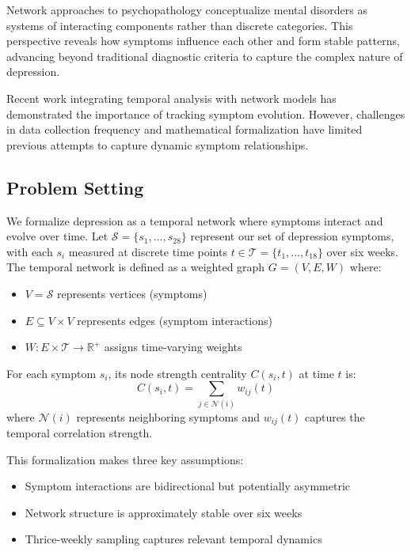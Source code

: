 \documentclass{article} %
\begin{document}
Network approaches to psychopathology \citep{Fried2016MentalDA} conceptualize mental disorders as systems of interacting components rather than discrete categories. This perspective reveals how symptoms influence each other and form stable patterns, advancing beyond traditional diagnostic criteria to capture the complex nature of depression.

Recent work integrating temporal analysis with network models \citep{Robinaugh2019TheNA} has demonstrated the importance of tracking symptom evolution. However, challenges in data collection frequency and mathematical formalization have limited previous attempts to capture dynamic symptom relationships.

\subsection{Problem Setting}
\label{subsec:problem}

We formalize depression as a temporal network where symptoms interact and evolve over time. Let $\mathcal{S} = \{s_1, \ldots, s_{28}\}$ represent our set of depression symptoms, with each $s_i$ measured at discrete time points $t \in \mathcal{T} = \{t_1, \ldots, t_{18}\}$ over six weeks. The temporal network is defined as a weighted graph $G = (V, E, W)$ where:

\begin{itemize}
    \item $V = \mathcal{S}$ represents vertices (symptoms)
    \item $E \subseteq V \times V$ represents edges (symptom interactions)
    \item $W\colon E \times \mathcal{T} \rightarrow \mathbb{R}^+$ assigns time-varying weights
\end{itemize}

For each symptom $s_i$, its node strength centrality $C(s_i, t)$ at time $t$ is:
\begin{equation}
    C(s_i, t) = \sum_{j \in \mathcal{N}(i)} w_{ij}(t)
\end{equation}
where $\mathcal{N}(i)$ represents neighboring symptoms and $w_{ij}(t)$ captures the temporal correlation strength.

This formalization makes three key assumptions:
\begin{itemize}
    \item Symptom interactions are bidirectional but potentially asymmetric
    \item Network structure is approximately stable over six weeks
    \item Thrice-weekly sampling captures relevant temporal dynamics
\end{itemize}
\end{document}
